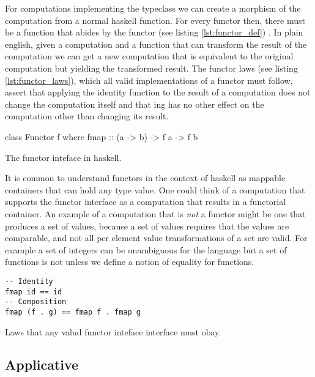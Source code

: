 For computations implementing the  typeclass we can
create a morphism of the computation from a normal haskell
function. For every functor  then, there must be a function
 that abides by the functor (see
listing \ref{lst:functor_def})
\cite{mcbrideApplicativeProgrammingEffects2008}. In plain english,
given a computation and a function that can transform the result of
the computation we can get a new computation that is equivalent to the
original computation but yielding the transformed result. The functor
laws (see listing \ref{lst:functor_laws}), which all valid
implementations of a functor must follow, assert that applying the
identity function to the result of a computation does not change the
computation itself and that  ing has no other effect on the
computation other than changing its result.
\begin{code}
\begin{haskellcode}
class Functor f where
  fmap :: (a -> b) -> f a -> f b
\end{haskellcode}
\caption{\label{lst:functor_def}The functor inteface in haskell.}
\end{code}

It is common to understand functors in the context of haskell as
mappable containers that can hold any type value. One could think of a
computation that supports the functor interface as a computation that
results in a functorial container. An example of a computation that is
\emph{not} a functor might be one that produces a set of values,
because a set of values requires that the values are comparable, and
not all per element value transformations of a set are valid. For
example a set of integers  can be unambiguous for the
language but a set of functions  is not
unless we define a notion of equality for functions.

\begin{code}
\begin{verbatim}
-- Identity
fmap id == id
-- Composition
fmap (f . g) == fmap f . fmap g
\end{verbatim}
\caption{\label{lst:functor_laws}Laws that any valud functor inteface interface must obay.}
\end{code}


  \subsection{Applicative}

